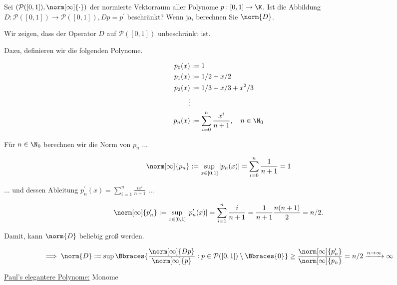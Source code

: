 
\begin{exercise}

Sei $(\mathcal{P}([0, 1]), \norm[\infty]{\cdot})$ der normierte Vektorraum aller Polynome $p: [0, 1] \to \K$.
Ist die Abbildung $D: \mathcal{P}([0, 1]) \to \mathcal{P}([0, 1]), Dp = p^\prime$ beschränkt?
Wenn ja, berechnen Sie $\norm{D}$.

\end{exercise}


\begin{solution}

Wir zeigen, dass der Operator $D$ auf $\mathcal{P}([0, 1])$ unbeschränkt ist.

Dazu, definieren wir die folgenden Polynome.

\begin{align*}
    p_0(x) & := 1 \\
    p_1(x) & := 1/2 + x/2 \\
    p_2(x) & := 1/3 + x/3 + x^2 / 3 \\
    \vdots & \\
    p_n(x) & := \sum_{i=0}^n \frac{x^i}{n+1}, \quad n \in \N_0
\end{align*}

Für $n \in \N_0$ berechnen wir die Norm von $p_n$ ...

\begin{align*}
    \norm[\infty]{p_n}
    :=
    \sup_{x \in [0, 1]} |p_n(x)|
    =
    \sum_{i=0}^n \frac{1}{n+1} = 1
\end{align*}

... und dessen Ableitung $p_n^\prime(x) = \sum_{i=1}^n \frac{i x^i}{n+1}$ ...

\begin{align*}
    \norm[\infty]{p_n^\prime}
    :=
    \sup_{x \in [0, 1]} |p_n^\prime(x)|
    =
    \sum_{i=1}^n \frac{i}{n+1}
    =
    \frac{1}{n+1} \frac{n (n+1)}{2} = n/2.
\end{align*}

Damit, kann $\norm{D}$ beliebig groß werden.

\begin{align*}
    \implies
    \norm{D}
    :=
    \sup
    \Bbraces
    {
        \frac
        {
            \norm[\infty]{Dp}
        }{
            \norm[\infty]{p}
        }:
        p \in \mathcal{P}([0, 1]) \setminus \Bbraces{0}
    }
    \geq
    \frac{\norm[\infty]{p_n^\prime}}{\norm[\infty]{p_n}}
    =
    n/2 \xrightarrow{n \to \infty} \infty
\end{align*}

\underline{Paul's elegantere Polynome:}
Monome

\end{solution}

